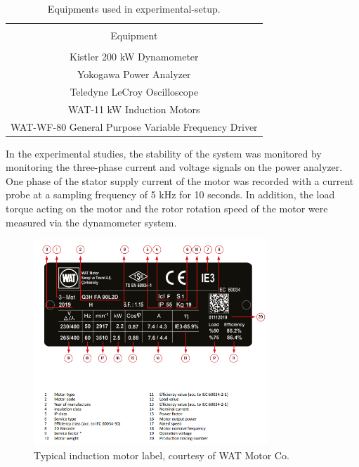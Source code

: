 \begin{table}[h]
	{\setlength{\tabcolsep}{12pt}
		\caption{Equipments used in experimental-setup.}
		\begin{center}
			\vspace{-6mm}
			\begin{tabular}{c}
				\hline \\[-2.45ex] \hline \\[-2.1ex]
				Equipment\\
				\hline \\[-1.8ex]
				Kistler 200 kW Dynamometer  \\
				Yokogawa Power Analyzer  \\
				Teledyne LeCroy Oscilloscope  \\
				WAT-11 kW Induction Motors   \\
				WAT-WF-80 General Purpose Variable Frequency Driver   \\
				\hline
			\end{tabular}
			\vspace{-6mm}
		\end{center}
		\label{Table3.1}}
\end{table}

In the experimental studies, the stability of the system was monitored by monitoring the three-phase current and voltage signals on the power analyzer. One phase of the stator supply current of the motor was recorded with a current probe at a sampling frequency of 5 kHz for 10 seconds. In addition, the load torque acting on the motor and the rotor rotation speed of the motor were measured via the dynamometer system.

\begin{figure}[h]
	\centering
	\includegraphics[width=250pt,keepaspectratio=true]{./fig/plate.PNG}
	\caption{Typical induction motor label, courtesy of WAT Motor Co.}	
	\label{plate}
\end{figure}

